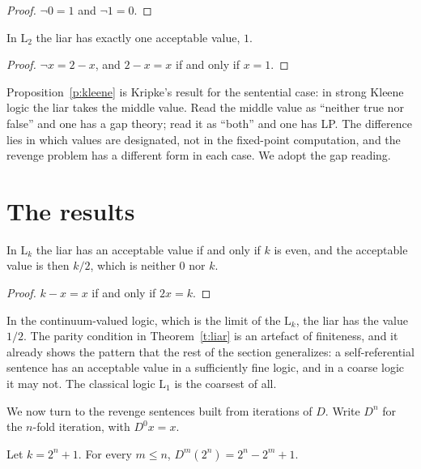\documentclass{situationist-preprint}
\begin{document}
\begin{proof}
$\neg 0 = 1$ and $\neg 1 = 0$.
\end{proof}

\begin{proposition}\label{p:kleene}
In $\mathrm{L}_2$ the liar has exactly one acceptable value, $1$.
\end{proposition}

\begin{proof}
$\neg x = 2 - x$, and $2 - x = x$ if and only if $x = 1$.
\end{proof}

Proposition~\ref{p:kleene} is Kripke's result for the sentential case: in strong Kleene logic the liar takes the middle value. Read the middle value as \enquote{neither true nor false} and one has a gap theory; read it as \enquote{both} and one has LP. The difference lies in which values are designated, not in the fixed-point computation, and the revenge problem has a different form in each case. We adopt the gap reading.

\section{The results}\label{s:results}

\begin{theorem}\label{t:liar}
In $\mathrm{L}_k$ the liar has an acceptable value if and only if $k$ is even, and the acceptable value is then $k/2$, which is neither $0$ nor $k$.
\end{theorem}

\begin{proof}
$k - x = x$ if and only if $2x = k$.
\end{proof}

In the continuum-valued logic, which is the limit of the $\mathrm{L}_k$, the liar has the value $1/2$. The parity condition in Theorem~\ref{t:liar} is an artefact of finiteness, and it already shows the pattern that the rest of the section generalizes: a self-referential sentence has an acceptable value in a sufficiently fine logic, and in a coarse logic it may not. The classical logic $\mathrm{L}_1$ is the coarsest of all.

We now turn to the revenge sentences built from iterations of $D$. Write $D^n$ for the $n$-fold iteration, with $D^0 x = x$.

\begin{lemma}\label{l:iterate}
Let $k = 2^n + 1$. For every $m \leq n$, $D^m(2^n) = 2^n - 2^m + 1$.
\end{lemma}
\end{document}
